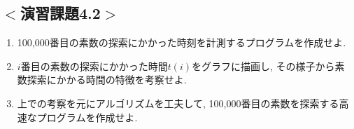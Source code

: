 \subsection*{$<$演習課題4.2$>$}
\begin{enumerate}
\item 100,000番目の素数の探索にかかった時刻を計測するプログラムを作成せよ.
\item $i$番目の素数の探索にかかった時間$t(i)$をグラフに描画し,
その様子から素数探索にかかる時間の特徴を考察せよ.
\item 上での考察を元にアルゴリズムを工夫して, 100,000番目の素数を探索する高速なプログラムを作成せよ.
\end{enumerate}







